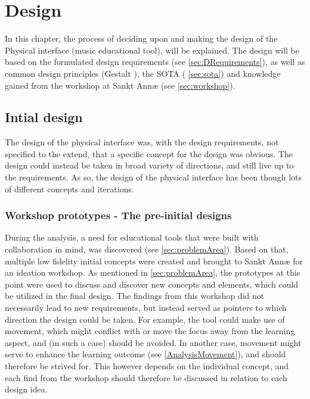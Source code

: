 \chapter{Design}

In this chapter, the process of deciding upon and making the design of the Physical interface (music educational tool), will be explained. The design will be based on the formulated design requirements (see \autoref{sec:DRequirements}), as well as common design principles (Gestalt \cite{gestalt}), the SOTA ( \autoref{sec:sota}) and knowledge gained from the workshop at Sankt Annæ (see \autoref{sec:workshop}). 


\section{Intial design}
The design of the physical interface was, with the design requirements, not specified to the extend, that a specific concept for the design was obvious. The design could instead be taken in broad variety of directions, and still live up to the requirements. As so, the design of the physical interface has been though lots of different concepts and iterations. 

\subsection {Workshop prototypes - The pre-initial designs}
During the analysis, a need for educational tools that were built with collaboration in mind, was discovered (see \autoref{sec:problemArea}). Based on that, multiple low fidelity initial concepts were created and brought to Sankt Annæ for an ideation workshop. As mentioned in \autoref{sec:problemArea}, the prototypes at this point were used to discuss and discover new concepts and elements, which could be utilized in the final design. The findings from this workshop did not necessarily lead to new requirements, but instead served as pointers to which direction the design could be taken. For example, the tool could make use of movement, which might conflict with or move the focus away from the learning aspect, and (in such a case) should be avoided. In another case, movement might serve to enhance the learning outcome (see \autoref{AnalysisMovement}), and should therefore be strived for. This however depends on the individual concept, and each find from the workshop should therefore be discussed in relation to each design idea.\\\\

